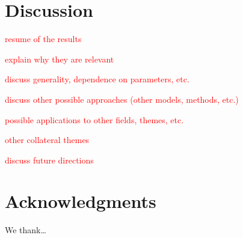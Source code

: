 \documentclass[12pt, a4paper, final, fleqn]{article}
\begin{document}
\section{Discussion}
\label{discussion}

\textcolor{red}{resume of the results}

\textcolor{red}{explain why they are relevant}

\textcolor{red}{discuss generality, dependence on parameters, etc.}

\textcolor{red}{discuss other possible approaches (other models, methods, etc.)}

\textcolor{red}{possible applications to other fields, themes, etc.}

\textcolor{red}{other collateral themes}

\textcolor{red}{discuss future directions}

\section*{Acknowledgments}

We thank\dots 




\clearpage

\end{document}
